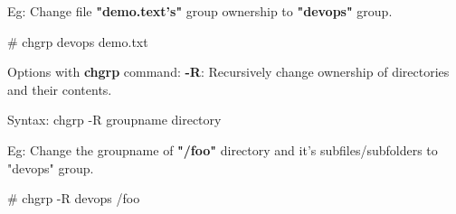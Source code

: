 \begin{flushleft}
Eg: Change file \textbf{"demo.text's"} group ownership to \textbf{"devops"} group.
\begin{tcolorbox}[breakable,notitle,boxrule=-0pt,colback=black,colframe=black]
		\color{green}
		\font=9pt
		\# chgrp devops demo.txt
		\font=4pt
\end{tcolorbox}
	
Options with \textbf{chgrp} command:	
\newline
\textbf{-R}: Recursively change ownership of directories and their contents.
\begin{tcolorbox}[breakable,notitle,boxrule=0pt,colback=pink,colframe=pink]
	\color{black}
	\font=9pt
	Syntax: chgrp -R groupname directory
	\font=4pt
\end{tcolorbox}
Eg: Change the groupname of \textbf{"/foo"} directory and it's subfiles/subfolders to "devops" group.
\begin{tcolorbox}[breakable,notitle,boxrule=-0pt,colback=black,colframe=black]
	\color{green}
	\font=9pt
	\# chgrp -R devops /foo
	\font=4pt
\end{tcolorbox}


	
\end{flushleft}

\newpage

